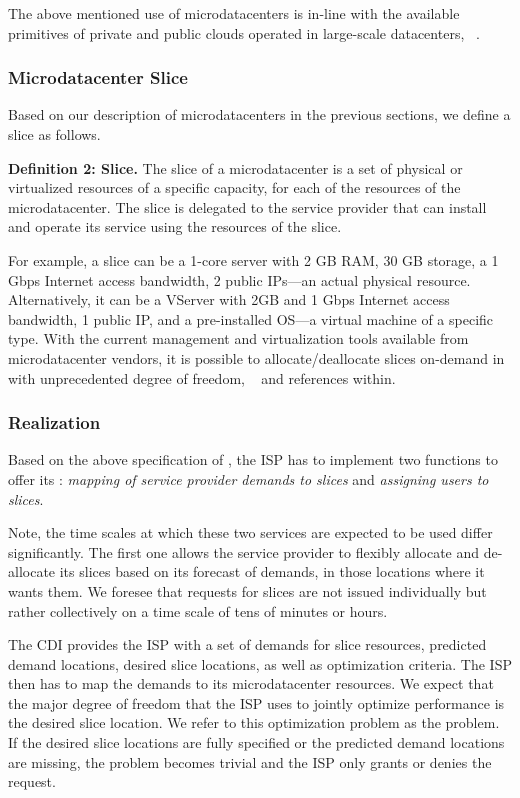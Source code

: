 The above mentioned use of microdatacenters is in-line with the available
primitives of private and public clouds operated in large-scale datacenters,
\eg~\cite{amazon,azure}.


\subsubsection{Microdatacenter Slice}\label{sec:Slice}

Based on our description of microdatacenters in the previous sections, we define
a slice as follows.

{\bf Definition 2: Slice.} The slice of a microdatacenter is a set of
physical or virtualized resources of a specific capacity, for each of the
resources of the microdatacenter. The slice is delegated to the service
provider that can install and operate its service using the resources of
the slice.

For example, a slice can be a 1-core server with 2 GB RAM, 30 GB storage, a
1 Gbps Internet access bandwidth, 2 public IPs---an actual physical resource.
Alternatively, it can be a VServer with 2GB and 1 Gbps Internet
access bandwidth, 1 public IP, and a pre-installed OS---a virtual machine
of a specific type.  With the current management and virtualization tools
available from microdatacenter vendors, it is possible to
allocate/deallocate slices on-demand in with unprecedented degree of
freedom, \eg~\cite{aboveclouds} and references within.


\subsubsection{\OnService Realization}\label{sec:Realization}

Based on the above specification of \onservice, the ISP has to implement two
functions to offer its \onserviceemph: \emph{mapping of service pro\-vi\-der
demands to slices} and \emph{assigning users to slices}.

Note, the time scales at which these two services are expected to be used
differ significantly. The first one allows the service provider to flexibly
allocate and de-allocate its slices based on its forecast of demands, in those
locations where it wants them.  We foresee that requests for slices are not
issued individually but rather collectively on a time scale of tens of minutes
or hours.

The CDI provides the ISP with a set of demands for slice resources, predicted
demand locations, desired slice locations, as well as optimization criteria.
The ISP then has to map the demands to its microdatacenter resources.  We
expect that the major degree of freedom that the ISP uses to jointly optimize
performance is the desired slice location. We refer to this optimization
problem as the \sliceallocation problem. If the desired slice locations are
fully specified or the predicted demand locations are missing, the
\sliceallocation problem becomes trivial and the ISP only grants or denies the
request.

